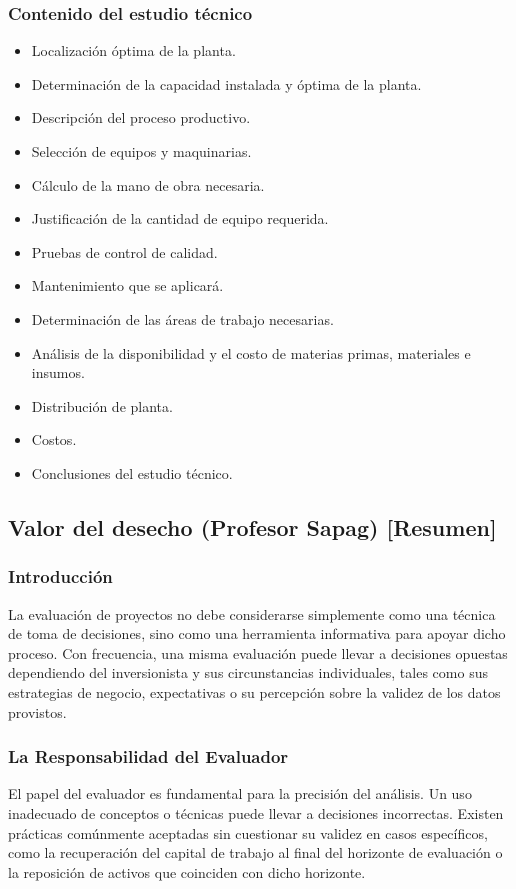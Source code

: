 \documentclass{templateNote}
\begin{document}
\subsubsection*{Contenido del estudio técnico}
\begin{itemize}
    \item Localización óptima de la planta.
    \item Determinación de la capacidad instalada y óptima de la planta.
    \item Descripción del proceso productivo.
    \item Selección de equipos y maquinarias.
    \item Cálculo de la mano de obra necesaria.
    \item Justificación de la cantidad de equipo requerida.
    \item Pruebas de control de calidad.
    \item Mantenimiento que se aplicará.
    \item Determinación de las áreas de trabajo necesarias.
    \item Análisis de la disponibilidad y el costo de materias primas, materiales e insumos.
    \item Distribución de planta.
    \item Costos.
    \item Conclusiones del estudio técnico.
\end{itemize}

\newpage
\subsection*{Valor del desecho (Profesor Sapag) [Resumen]}

\subsubsection*{Introducción}
La evaluación de proyectos no debe considerarse simplemente como una técnica de toma de decisiones, sino como una herramienta informativa para apoyar dicho proceso. Con frecuencia, una misma evaluación puede llevar a decisiones opuestas dependiendo del inversionista y sus circunstancias individuales, tales como sus estrategias de negocio, expectativas o su percepción sobre la validez de los datos provistos.

\subsubsection*{La Responsabilidad del Evaluador}
El papel del evaluador es fundamental para la precisión del análisis. Un uso inadecuado de conceptos o técnicas puede llevar a decisiones incorrectas. Existen prácticas comúnmente aceptadas sin cuestionar su validez en casos específicos, como la recuperación del capital de trabajo al final del horizonte de evaluación o la reposición de activos que coinciden con dicho horizonte.
\end{document}
